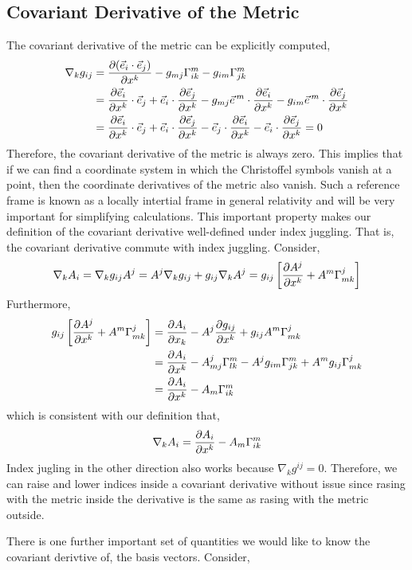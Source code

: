 \documentclass[11pt, a4paper]{article}
\begin{document}
\subsection{Covariant Derivative of the Metric}
The covariant derivative of the metric can be explicitly computed,
\begin{align*}
\nabla_kg_{ij} &= \frac{\partial{(\vec{e}_i\cdot \vec{e}_j)}}{\partial{x^k}} - g_{mj} \Gamma^m_{ik} - g_{im} \Gamma^m_{jk}
\\
& = \frac{\partial{\vec{e}_i}}{\partial{x^k}}\cdot \vec{e}_j  + \vec{e}_i\cdot \frac{\partial{\vec{e}_j}}{\partial{x^k}} - g_{mj} \vec{e}^{\, m} \cdot \frac{\partial{\vec{e}_i}}{\partial{x^k}} - g_{im} \vec{e}^{\, m} \cdot \frac{\partial{\vec{e}_j}}{\partial{x^k}} 
\\
& = \frac{\partial{\vec{e}_i}}{\partial{x^k}}\cdot \vec{e}_j  + \vec{e}_i\cdot \frac{\partial{\vec{e}_j}}{\partial{x^k}} - \vec{e}_j \cdot \frac{\partial{\vec{e}_i}}{\partial{x^k}} - \vec{e}_i \cdot \frac{\partial{\vec{e}_j}}{\partial{x^k}} = 0 
\end{align*}
Therefore, the covariant derivative of the metric is always zero. This implies that if we can find a coordinate system in which the Christoffel symbols vanish at a point, then the coordinate derivatives of the metric also vanish. Such a reference frame is known as a locally intertial frame in general relativity and will be very important for simplifying calculations. 
This important property makes our definition of the covariant derivative well-defined under index juggling. That is, the covariant derivative commute with index juggling. Consider,
\[\nabla_k A_i = \nabla_kg_{ij}A^j = A^j\nabla_kg_{ij}+g_{ij}\nabla_kA^j = g_{ij}\left[\frac{\partial{A^j}}{\partial{x^k}} + A^m\Gamma^j_{mk}\right] \]
Furthermore, 
\begin{align*}
g_{ij}\left[\frac{\partial{A^j}}{\partial{x^k}} + A^m\Gamma^j_{mk}\right] & = \frac{\partial{A_i}}{\partial{x_k}}-A^j\frac{\partial{g_{ij}}}{\partial{x^k}} + g_{ij}A^m\Gamma^j_{mk}
\\
& =  \frac{\partial{A_i}}{\partial{x^k}} - A^j_{mj}\Gamma^m_{lk} - A^jg_{im}\Gamma^m_{jk} + A^mg_{ij}\Gamma^j_{mk}
\\
& = \frac{\partial{A_i}}{\partial{x^k}} - A_m\Gamma^m_{ik}
\end{align*}
which is consistent with our definition that,
 \[ \nabla_kA_i = \frac{\partial{A_i}}{\partial{x^k}} - A_m\Gamma^m_{ik}\]
Index jugling in the other direction also works because $\nabla_kg^{ij} = 0$. Therefore,  we can raise and lower indices inside a covariant derivative without issue since rasing with the metric inside the derivative is the same as rasing with the metric outside. 
\par
There is one further important set of quantities we would like to know the covariant derivtive of, the basis vectors. Consider,
\end{document}
